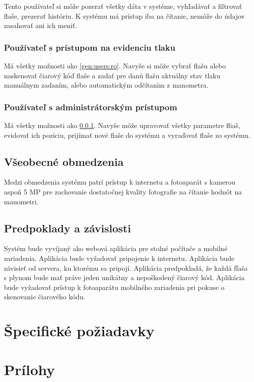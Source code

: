 \documentclass[hreffootnote]{zah}
\begin{document}
Tento používateľ si môže pozerať všetky dáta v systéme, vyhľadávať a filtrovať flaše, prezerať históriu. K systému má prístup iba na čítanie, nemôže do údajov zasahovať ani ich meniť.

\subsubsection{Používateľ s prístupom na evidenciu tlaku}
\label{gen:users:meter}

Má všetky možnosti ako \ref{gen:users:ro}. Navyše si môže vybrať flašu alebo naskenovať čiarový kóď flaše a zadať pre danú flašu aktuálny stav tlaku manuálnym zadaním, alebo automatickým odčítaním z manometra.

\subsubsection{Používateľ s administrátorským prístupom}
\label{gen:users:admin}

Má všetky možnosti ako \ref{gen:users:meter}. Navyše môže upravovať všetky parametre fliaš, evidovať ich pozíciu, prijímať nové flaše do systému a vyraďovať flaše zo systému.

\subsection{Všeobecné obmedzenia}
\label{gen:constraints}

Medzi obmedzenia systému patrí prístup k internetu a fotoaparát s kamerou aspoň 5 MP pre zachovanie dostatočnej kvality fotografie na čítanie hodnôt na manometri. 

\subsection{Predpoklady a závislosti}
\label{gen:deps}

Systém bude vyvíjaný ako webová aplikácia pre stolné počítače a mobilné zariadenia. Aplikácia bude vyžadovať pripojenie k internetu. Aplikácia bude závisieť od servera, ku ktorému sa pripojí. Aplikácia predpokladá, že každá fľaša s plynom bude mať práve jeden unikátny a nepoškodený čiarový kód. Aplikácia bude vyžadovať prístup k fotoaparátu mobilného zariadenia pri pokuse o skenovanie čiarového kódu.

\cleardoublepage
\section{Špecifické požiadavky}
\label{reqs}

\cleardoublepage
\section{Prílohy}
\end{document}
